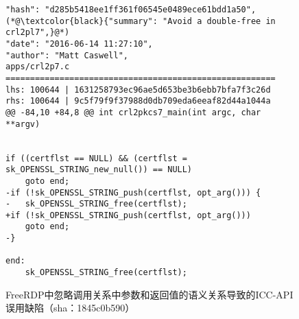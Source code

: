 \begin{figure}[t]
	\centering
\begin{lstlisting}
"hash": "d285b5418ee1ff361f06545e0489ece61bdd1a50",
(*@\textcolor{black}{"summary": "Avoid a double-free in crl2pl7",}@*)
"date": "2016-06-14 11:27:10",
"author": "Matt Caswell",
apps/crl2p7.c
=======================================================
lhs: 100644 | 1631258793ec96ae5d653be3b6ebb7bfa7f3c26d
rhs: 100644 | 9c5f79f9f37988d0db709eda6eeaf82d44a1044a
@@ -84,10 +84,8 @@ int crl2pkcs7_main(int argc, char **argv)


if ((certflst == NULL) && (certflst = sk_OPENSSL_STRING_new_null()) == NULL)
	goto end;
-if (!sk_OPENSSL_STRING_push(certflst, opt_arg())) {
-	sk_OPENSSL_STRING_free(certflst);
+if (!sk_OPENSSL_STRING_push(certflst, opt_arg()))
	goto end;
-}

end:
	sk_OPENSSL_STRING_free(certflst);
\end{lstlisting}
	\caption{
	FreeRDP中忽略调用关系中参数和返回值的语义关系导致的ICC-API误用缺陷（sha：1845c0b590）
	}
	\label{fig:2-3-icc-3}
\end{figure}